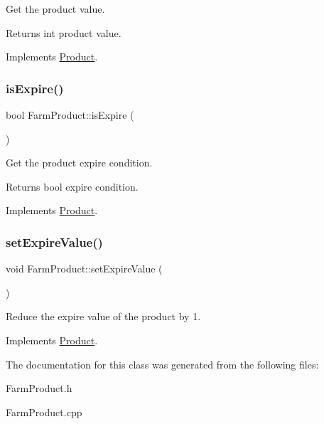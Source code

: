 Get the product value. \begin{DoxyReturn}{Returns}
int product value. 
\end{DoxyReturn}


Implements \hyperlink{classProduct_a5c56d625cae28f43b626578ac4611e43}{Product}.

\mbox{\label{classFarmProduct_a18cb875372c4e24ef79615bcd47a110e}} 
\subsubsection{\texorpdfstring{is\+Expire()}{isExpire()}}
{\footnotesize\ttfamily bool Farm\+Product\+::is\+Expire (\begin{DoxyParamCaption}{ }\end{DoxyParamCaption})\hspace{0.3cm}{\ttfamily [virtual]}}

Get the product expire condition. \begin{DoxyReturn}{Returns}
bool expire condition. 
\end{DoxyReturn}


Implements \hyperlink{classProduct_aec86d25d77417014f8780ea65416bac7}{Product}.

\mbox{\label{classFarmProduct_aea484f8f23984c14e0014fa7c35b9629}} 
\subsubsection{\texorpdfstring{set\+Expire\+Value()}{setExpireValue()}}
{\footnotesize\ttfamily void Farm\+Product\+::set\+Expire\+Value (\begin{DoxyParamCaption}{ }\end{DoxyParamCaption})\hspace{0.3cm}{\ttfamily [virtual]}}

Reduce the expire value of the product by 1. 

Implements \hyperlink{classProduct_a84aba139efc9cbcb05d47de168645463}{Product}.



The documentation for this class was generated from the following files\+:\begin{DoxyCompactItemize}
\item 
Farm\+Product.\+h\item 
Farm\+Product.\+cpp\end{DoxyCompactItemize}
